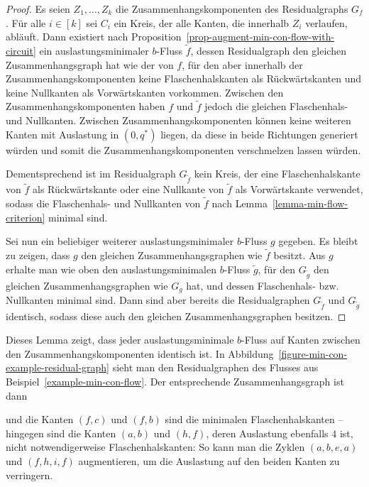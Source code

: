 \begin{proof}
	Es seien $Z_1,\dots, Z_k$ die Zusammenhangskomponenten des Residualgraphs $G_f$.
	Für alle $i\in [k]$ sei $C_i$ ein Kreis, der alle Kanten, die innerhalb $Z_i$ verlaufen, abläuft.
	Dann existiert nach Proposition~\ref{prop-augment-min-con-flow-with-circuit} ein auslastungsminimaler $b$-Fluss $\tilde{f}$, dessen Residualgraph den gleichen Zusammenhangsgraph hat wie der von $f$, für den aber innerhalb der Zusammenhangskomponenten keine Flaschenhalskanten als Rückwärtskanten und keine Nullkanten als Vorwärtskanten vorkommen.
	Zwischen den Zusammenhangskomponenten haben $f$ und $\tilde{f}$ jedoch die gleichen Flaschenhals- und Nullkanten.
	Zwischen Zusammenhangskomponenten können keine weiteren Kanten mit Auslastung in $(0, q^*)$ liegen, da diese in beide Richtungen generiert würden und somit die Zusammenhangskomponenten verschmelzen lassen würden.
	
	Dementsprechend ist im Residualgraph $G_{\tilde{f}}$ kein Kreis, der eine Flaschenhalskante von $\tilde{f}$ als Rückwärtskante oder eine Nullkante von $\tilde{f}$ als Vorwärtskante verwendet, sodass die Flaschenhals- und Nullkanten von $\tilde{f}$ nach Lemma~\ref{lemma-min-flow-criterion} minimal sind.
	
	Sei nun ein beliebiger weiterer auslastungsminimaler $b$-Fluss $g$ gegeben.
	Es bleibt zu zeigen, dass $g$ den gleichen Zusammenhangsgraphen wie $\tilde{f}$ besitzt.
	Aus $g$ erhalte man wie oben den auslastungsminimalen $b$-Fluss $\tilde{g}$, für den $G_{\tilde{g}}$ den gleichen Zusammenhangsgraphen wie $G_g$ hat, und dessen Flaschenhals- bzw. Nullkanten minimal sind.
	Dann sind aber bereits die Residualgraphen $G_{\tilde{f}}$ und $G_{\tilde{g}}$ identisch, sodass diese auch den gleichen Zusammenhangsgraphen besitzen.
\end{proof}

Dieses Lemma zeigt, dass jeder auslastungsminimale $b$-Fluss auf Kanten zwischen den Zusammenhangskomponenten identisch ist.
In Abbildung~\ref{figure-min-con-example-residual-graph} sieht man den Residualgraphen des Flusses aus Beispiel~\ref{example-min-con-flow}.
Der entsprechende Zusammenhangsgraph ist dann
\begin{center}
\end{center}
und die Kanten $(f,c)$ und $(f,b)$ sind die minimalen Flaschenhalskanten -- hingegen sind die Kanten $(a,b)$ und $(h,f)$, deren Auslastung ebenfalls $4$ ist, nicht notwendigerweise Flaschenhalskanten: So kann man die Zyklen $(a,b,e,a)$ und $(f,h,i,f)$ augmentieren, um die Auslastung auf den beiden Kanten zu verringern.

